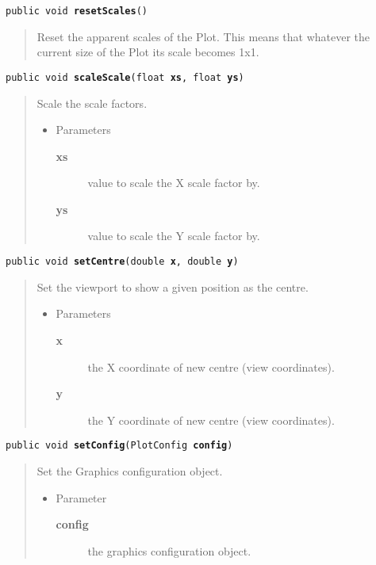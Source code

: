 \documentclass[twoside,11pt,nolof]{starlink}
\providecommand{\method}[1]{\texttt{#1}}
\newenvironment{desc}{\begin{quote}}{\end{quote}}
\begin{document}
\method{public void \textbf{resetScales}()\label{l196}\label{l197}}
\begin{desc}Reset the apparent scales of the Plot. This means that
 whatever the current size of the Plot its scale becomes 1x1.
\end{desc}

\method{public void \textbf{scaleScale}(\texttt{float} \textbf{xs}, \texttt{float} \textbf{ys})\label{l198}\label{l199}}
\begin{desc}Scale the scale factors.
\begin{itemize}
\item{Parameters
  \begin{description}
   \item[\textbf{xs}]{value to scale the X scale factor by.}
   \item[\textbf{ys}]{value to scale the Y scale factor by.}
  \end{description}}
\end{itemize}
\end{desc}

\method{public void \textbf{setCentre}(\texttt{double} \textbf{x}, \texttt{double} \textbf{y})\label{l200}\label{l201}}
\begin{desc}Set the viewport to show a given position as the centre.
\begin{itemize}
\item{Parameters
  \begin{description}
   \item[\textbf{x}]{the X coordinate of new centre (view coordinates).}
   \item[\textbf{y}]{the Y coordinate of new centre (view coordinates).}
  \end{description}}
\end{itemize}
\end{desc}

\method{public void \textbf{setConfig}(\texttt{PlotConfig} \textbf{config})\label{l202}\label{l203}}
\begin{desc}Set the Graphics configuration object.
\begin{itemize}
\item{Parameter
  \begin{description}
   \item[\textbf{config}]{the graphics configuration object.}
  \end{description}}
\end{itemize}
\end{desc}
\end{document}
